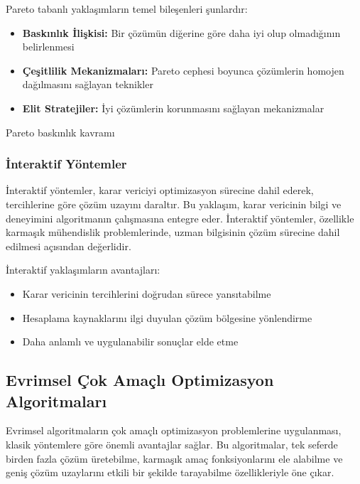 Pareto tabanlı yaklaşımların temel bileşenleri şunlardır:
\begin{itemize}
    \item \textbf{Baskınlık İlişkisi:} Bir çözümün diğerine göre daha iyi olup olmadığının belirlenmesi
    \item \textbf{Çeşitlilik Mekanizmaları:} Pareto cephesi boyunca çözümlerin homojen dağılmasını sağlayan teknikler
    \item \textbf{Elit Stratejiler:} İyi çözümlerin korunmasını sağlayan mekanizmalar
\end{itemize}

\begin{marginfigure}
\centering
{}
\caption{Pareto baskınlık kavramı}
\end{marginfigure}

\subsubsection{İnteraktif Yöntemler}
İnteraktif yöntemler, karar vericiyi optimizasyon sürecine dahil ederek, tercihlerine göre çözüm uzayını daraltır. Bu yaklaşım, karar vericinin bilgi ve deneyimini algoritmanın çalışmasına entegre eder. İnteraktif yöntemler, özellikle karmaşık mühendislik problemlerinde, uzman bilgisinin çözüm sürecine dahil edilmesi açısından değerlidir.

İnteraktif yaklaşımların avantajları:
\begin{itemize}
    \item Karar vericinin tercihlerini doğrudan sürece yansıtabilme
    \item Hesaplama kaynaklarını ilgi duyulan çözüm bölgesine yönlendirme
    \item Daha anlamlı ve uygulanabilir sonuçlar elde etme
\end{itemize}

\subsection{Evrimsel Çok Amaçlı Optimizasyon Algoritmaları}
Evrimsel algoritmaların çok amaçlı optimizasyon problemlerine uygulanması, klasik yöntemlere göre önemli avantajlar sağlar. Bu algoritmalar, tek seferde birden fazla çözüm üretebilme, karmaşık amaç fonksiyonlarını ele alabilme ve geniş çözüm uzaylarını etkili bir şekilde tarayabilme özellikleriyle öne çıkar.

